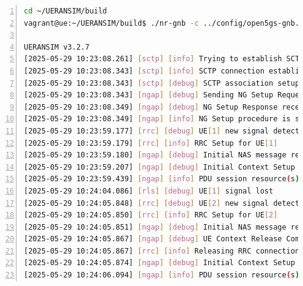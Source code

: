 \begin{lstlisting}[basicstyle=\small, frame=single, breaklines=true, postbreak=\mbox{\textcolor{red}{$\hookrightarrow$}\space}, escapeinside ={\%,}, escapechar={!}, numbers=left, language=sh, caption=gNB run en resultaat]
cd ~/UERANSIM/build
vagrant@ue:~/UERANSIM/build$ ./nr-gnb -c ../config/open5gs-gnb.yaml

UERANSIM v3.2.7
[2025-05-29 10:23:08.261] [sctp] [info] Trying to establish SCTP connection... (10.0.0.10:38412)
[2025-05-29 10:23:08.343] [sctp] [info] SCTP connection established (10.0.0.10:38412)
[2025-05-29 10:23:08.343] [sctp] [debug] SCTP association setup ascId[3]
[2025-05-29 10:23:08.343] [ngap] [debug] Sending NG Setup Request
[2025-05-29 10:23:08.349] [ngap] [debug] NG Setup Response received
[2025-05-29 10:23:08.349] [ngap] [info] NG Setup procedure is successful
[2025-05-29 10:23:59.177] [rrc] [debug] UE[1] new signal detected
[2025-05-29 10:23:59.179] [rrc] [info] RRC Setup for UE[1]
[2025-05-29 10:23:59.180] [ngap] [debug] Initial NAS message received from UE[1]
[2025-05-29 10:23:59.207] [ngap] [debug] Initial Context Setup Request received
[2025-05-29 10:23:59.439] [ngap] [info] PDU session resource(s) setup for UE[1] count[1]
[2025-05-29 10:24:04.086] [rls] [debug] UE[1] signal lost
[2025-05-29 10:24:05.848] [rrc] [debug] UE[2] new signal detected
[2025-05-29 10:24:05.850] [rrc] [info] RRC Setup for UE[2]
[2025-05-29 10:24:05.851] [ngap] [debug] Initial NAS message received from UE[2]
[2025-05-29 10:24:05.867] [ngap] [debug] UE Context Release Command received
[2025-05-29 10:24:05.867] [rrc] [info] Releasing RRC connection for UE[1]
[2025-05-29 10:24:05.874] [ngap] [debug] Initial Context Setup Request received
[2025-05-29 10:24:06.094] [ngap] [info] PDU session resource(s) setup for UE[2] count[1]
\end{lstlisting}

